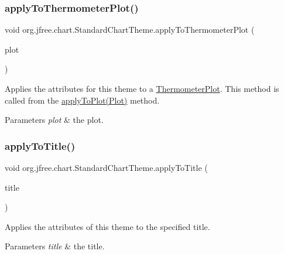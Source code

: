\subsubsection{\texorpdfstring{apply\+To\+Thermometer\+Plot()}{applyToThermometerPlot()}}
{\footnotesize\ttfamily void org.\+jfree.\+chart.\+Standard\+Chart\+Theme.\+apply\+To\+Thermometer\+Plot (\begin{DoxyParamCaption}\item[{\mbox{\hyperlink{classorg_1_1jfree_1_1chart_1_1plot_1_1_thermometer_plot}{Thermometer\+Plot}}}]{plot }\end{DoxyParamCaption})\hspace{0.3cm}{\ttfamily [protected]}}

Applies the attributes for this theme to a \mbox{\hyperlink{}{Thermometer\+Plot}}. This method is called from the \mbox{\hyperlink{classorg_1_1jfree_1_1chart_1_1_standard_chart_theme_ad80532276c7939f2edd60c1c54447d49}{apply\+To\+Plot(\+Plot)}} method.


\begin{DoxyParams}{Parameters}
{\em plot} & the plot. \\
\hline
\end{DoxyParams}
\mbox{\label{classorg_1_1jfree_1_1chart_1_1_standard_chart_theme_a8f70e3a4168f072d89828e305e613334}} 
\subsubsection{\texorpdfstring{apply\+To\+Title()}{applyToTitle()}}
{\footnotesize\ttfamily void org.\+jfree.\+chart.\+Standard\+Chart\+Theme.\+apply\+To\+Title (\begin{DoxyParamCaption}\item[{\mbox{\hyperlink{classorg_1_1jfree_1_1chart_1_1title_1_1_title}{Title}}}]{title }\end{DoxyParamCaption})\hspace{0.3cm}{\ttfamily [protected]}}

Applies the attributes of this theme to the specified title.


\begin{DoxyParams}{Parameters}
{\em title} & the title. \\
\hline
\end{DoxyParams}
\mbox{\label{classorg_1_1jfree_1_1chart_1_1_standard_chart_theme_a84a8a64bcf42fb6ceb2eea2a61538cfa}} 
